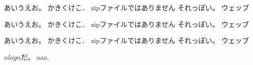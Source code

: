 あいうえお。
かきくけこ．
zipファイルではありません
それっぽい。
ウェッブ

あいうえお。
かきくけこ．
zipファイルではありません
それっぽい。
ウェッブ

あいうえお。
かきくけこ．
zipファイルではありません
それっぽい。
ウェッブ

$n log n$だ。
aaa.\cite{bbb:123}
